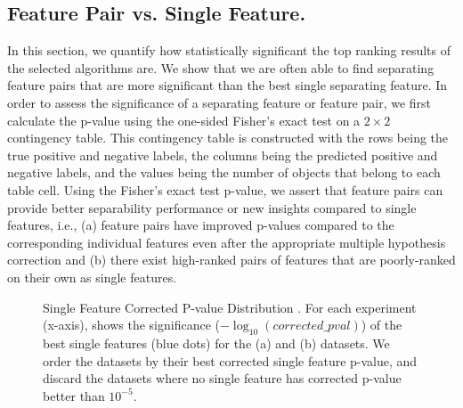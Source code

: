 \subsection{Feature Pair vs. Single Feature.}\label{sec:FPvSF}

In this section, we quantify how statistically significant the top ranking results of the selected algorithms are. We show that we are often able to find separating feature pairs that are more significant than the best single separating feature. In order to assess the significance of a separating feature or feature pair, we first calculate the p-value using the one-sided Fisher's exact test on a $2\times2$ contingency table. This contingency table is constructed with the rows being the true positive and negative labels, the columns being the predicted positive and negative labels, and the values being the number of objects that belong to each table cell. Using the Fisher's exact test p-value, we assert that feature pairs can provide better separability performance or new insights compared to single features, i.e., (a) feature pairs have improved p-values compared to the corresponding individual features even after the appropriate multiple hypothesis correction and (b) there exist high-ranked pairs of features that are poorly-ranked on their own as single features.

\begin{figure}[h]
\centering %
\vspace{-5mm}
\vspace{-5mm}
\caption{Single Feature Corrected P-value Distribution . For each experiment (x-axis), shows the significance ($-\log_{10} (corrected\_pval)$) of the \tophundred best single features (blue dots) for the (a) \msig and (b) \lincs datasets. We order the datasets by their best corrected single feature p-value, and discard the datasets where no single feature has corrected p-value better than $10^{-5}$.}
\vspace{-5mm}
\label{fig:singleF}
\end{figure}



